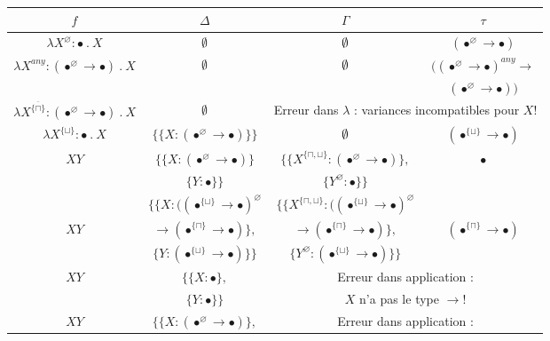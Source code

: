 \documentclass{rapport}
\renewcommand{\emptyset}{\font\cmsy = cmsy10 at 10pt
 \hbox{\cmsy \char 59}
}
\theoremstyle{plain}
\theoremstyle{remark}
\theoremstyle{definition}
\begin{document}
\begin{table}[H]
    \center
    \renewcommand{\arraystretch}{2}
    \begin{tabular}[b]{|c|c||c|c|}
    \hline
  	{\huge{\textbf{$f$}}} & {\huge{\textbf{$\Delta$}}} & {\huge{\textbf{$\Gamma$}}} & {\huge{\textbf{$\tau$}}} \\ \hline
 	\hline
 	$\lambda X^{\varnothing} : \bullet \ . \ X$ & $\emptyset$ & $\emptyset$ & $(\bullet^{\varnothing} \rightarrow \bullet)$ \\
 	\hline
 	$\lambda X^{any} : (\bullet^{\varnothing} \rightarrow \bullet) \ . \ X$ & $\emptyset$ & $\emptyset$ & $((\bullet^{\varnothing} \rightarrow \bullet)^{any} \rightarrow$ \\
 	& & & $(\bullet^{\varnothing} \rightarrow \bullet))$ \\
 	\hline
 	$\lambda X^{\overline{\{\sqcap\}}} : (\bullet^{\varnothing} \rightarrow \bullet) \ . \ X$ & $\emptyset$ & \multicolumn{2}{c|}{Erreur dans $\lambda$ : variances incompatibles pour $X$!} \\
 	\hline
 	$\lambda X^{\{\sqcup\}} : \bullet \ . \ X$ & $\{{\{X : (\bullet^{\varnothing} \rightarrow \bullet)\}}\}$ & $\emptyset$ & $(\bullet^{\{\sqcup\}} \rightarrow \bullet)$ \\
 	\hline
 	$X Y$ & $\{{\{X : (\bullet^{\varnothing} \rightarrow \bullet)\}}$ & $\{{\{X^{\{\sqcap, \sqcup\}} : (\bullet^{\varnothing} \rightarrow \bullet)\}},$ & $\bullet$ \\
 	& ${\{Y : \bullet\}}\}$ & ${\{Y^{\varnothing} : \bullet\}}\}$ & \\
 	\hline
 	& $\{\{X : ((\bullet^{\{\sqcup\}} \rightarrow \bullet)^{\varnothing}$ & $\{\{X^{\{\sqcap, \sqcup\}} : ((\bullet^{\{\sqcup\}} \rightarrow \bullet)^{\varnothing}$ & \\
 	$X Y$ & $ \rightarrow (\bullet^{\{\sqcap\}} \rightarrow \bullet)\}, $ & $\rightarrow (\bullet^{\{\sqcap\}} \rightarrow \bullet)\}, $ & $(\bullet^{\{\sqcap\}} \rightarrow \bullet)$ \\
 	& ${\{Y : (\bullet^{\{\sqcup\}} \rightarrow \bullet)\}}\}$ & ${\{Y^{\varnothing} : (\bullet^{\{\sqcup\}} \rightarrow \bullet)\}}\}$ & \\
 	\hline
 	$X Y$ & $\{\{X : \bullet\},$ & \multicolumn{2}{c|}{Erreur dans application :} \\
 	& $\{Y : \bullet\}\}$ & \multicolumn{2}{c|}{$X$ n'a pas le type $\rightarrow$!} \\
 	\hline
 	$X Y$ & $\{\{X : (\bullet^{\varnothing} \rightarrow \bullet)\},$ & \multicolumn{2}{c|}{Erreur dans application :} \\

\end{tabular}
\end{table}
\end{document}

